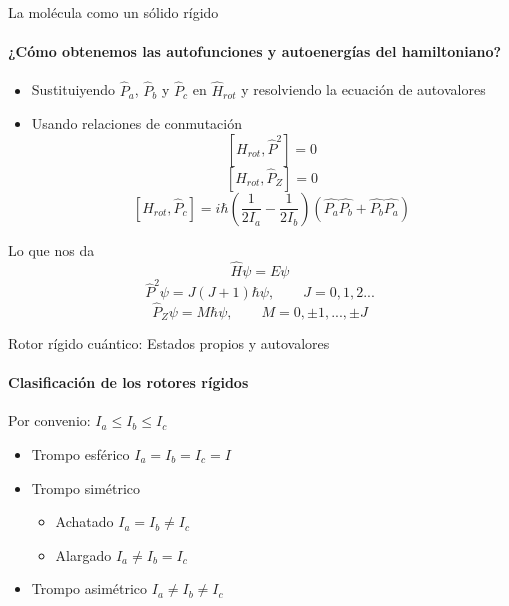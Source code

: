 \documentclass[a4paper]{beamer}
\begin{document}
\begin{frame}{La molécula como un sólido rígido}
\framesubtitle{¿Cómo obtenemos las autofunciones y autoenergías del hamiltoniano?}
\begin{itemize}
\item	Sustituiyendo $\hat P_a$, $\hat P_b$ y $\hat P_c$ en $\hat H_{rot}$ y resolviendo la ecuación de autovalores 
\item Usando relaciones de conmutación 
\begin{equation*}
\left[H_{rot}, \hat P^2 \right] = 0
\end{equation*}
\begin{equation*}
\left[H_{rot}, \hat P_Z \right] = 0
\end{equation*}
\begin{equation*}
\left[H_{rot}, \hat P_c \right] = i\hbar \left(\frac{1}{2I_a}-\frac{1}{2I_b}\right)\left(\hat{P_a}\hat{P_b}+\hat{P_b}\hat{P_a}\right)
\end{equation*}
\end{itemize}
Lo que nos da 
\begin{equation*}
\hat H\psi = E\psi
\end{equation*}
\begin{equation*}
\hat P^2\psi = J(J+1)\hbar \psi, \qquad J=0,1,2...
\end{equation*}
\begin{equation*}
\hat P_Z\psi = M\hbar\psi, \qquad M = 0,\pm 1,...,\pm J
\end{equation*}
\end{frame}

\begin{frame}{Rotor rígido cuántico: Estados propios y autovalores}
\framesubtitle{Clasificación de los rotores rígidos}
Por convenio: $I_a \leq I_b \leq I_c$
\begin{itemize}
\item Trompo esférico  $I_a=I_b=I_c= I$
\item Trompo simétrico
\begin{itemize}
\item Achatado  $I_a=I_b\neq I_c$
\item Alargado $I_a\neq I_b=I_c$
\end{itemize}
\item Trompo asimétrico $I_a \neq I_b\neq I_c$
\end{itemize}
\end{frame}
\end{document}
